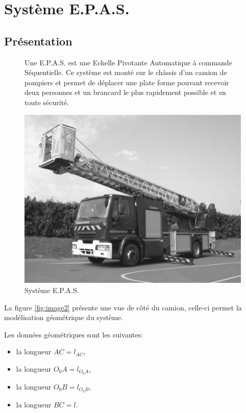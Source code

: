 

\section{Système E.P.A.S.}

\subsection{Présentation}

\begin{figure}[htbp]
\begin{minipage}[c]{.55\linewidth}
Une E.P.A.S. est une Echelle Pivotante Automatique à commande Séquentielle. Ce système est monté sur le châssis d'un camion de pompiers et permet de déplacer une plate forme pouvant recevoir deux personnes et un brancard le plus rapidement possible et en toute sécurité.
\end{minipage}
\hfill
\begin{minipage}[c]{.40\linewidth}
\begin{center}
\includegraphics[width=0.8\linewidth]{img/photo_camion.jpg}
\caption{Système E.P.A.S.}
\label{fig:image1}
\end{center}
\end{minipage}
\end{figure}

La figure \ref{fig:image2} présente une vue de côté du camion, celle-ci permet la modélisation géométrique du système.

Les données géométriques sont les suivantes:
\begin{itemize}
 \item la longueur $AC=l_{AC}$,
 \item la longueur $O_0A=l_{O_0A}$,
 \item la longueur $O_0B=l_{O_0B}$,
 \item la longueur $BC=l$.
\end{itemize}

